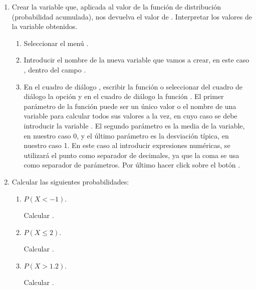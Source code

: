 \begin{enumerate}[leftmargin=*]
\begin{enumerate}
\item Crear la variable  que, aplicada al valor 
de la función de distribución (probabilidad
acumulada), nos devuelva el valor de .
Interpretar los valores de la variable obtenidos.
\begin{indicacion}
\begin{enumerate}
\item Seleccionar el menú .
\item Introducir el nombre de la nueva variable que vamos a crear, en 
este caso , dentro del campo 
.


\item En el cuadro de diálogo , escribir la 
función  o seleccionar del cuadro 
de diálogo  la opción  y en el 
cuadro de diálogo  la 
función . El primer parámetro de la función 
 puede ser un único valor o el 
nombre de una variable para calcular todos sus valores a la vez, en cuyo 
caso se debe introducir la variable .
El segundo parámetro es la media de la variable, en nuestro caso 0, y el 
último parámetro es la desviación típica, en nuestro caso 1. En este caso 
al introducir expresiones numéricas, se utilizará el punto como 
separador de decimales, ya que la coma se usa como separador de 
parámetros. Por último hacer click sobre el botón .
\end{enumerate}
\end{indicacion}


\item Calcular las siguientes probabilidades:
\begin{enumerate}
\item $P(X< -1)$.
\begin{indicacion}
Calcular .
\end{indicacion}

\item $P(X\leq 2)$.
\begin{indicacion}
Calcular .
\end{indicacion}

\item $P(X> 1.2)$.
\begin{indicacion}
Calcular .
\end{indicacion}


\end{enumerate}
\end{enumerate}
\end{enumerate}
